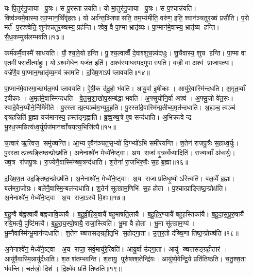 यः पि॒तुर॑नु॒जाया पु॒त्रः। स पु॒रस्तान्नयति। यो मा॒तुर॑नु॒जाया पु॒त्रः। स प॒श्चान्न॑यति। विष्व॑ञ्चमे॒वास्मात्पा॒प्मान॒व्विँवृ॑हतः। यो अर्व॑न्त॒ञ्जिघासति॒ तम॒भ्य॑मीति॒ वरु॑ण॒ इति॒ श्वान॑ञ्चतुर॒ख्षं प्रसौ॑ति। प॒रो मर्त॑ प॒रश्श्वेति॒ शुन॑श्चतुर॒ख्षस्य॒ प्रह॑न्ति। श्वेव॒ वै पा॒प्मा भ्रातृ॑व्यः। पा॒प्मान॑मे॒वास्य॒ भ्रातृ॑व्य हन्ति। सै॒ध्र॒कम्मुस॑लम्भवति॥१३॥

कर्म॑कर्मै॒वास्मै॑ साधयति। पौ॒श्च॒ले॒यो ह॑न्ति। पु॒श्च॒ल्वाव्वैँ दे॒वाश्शुच॒न्न्य॑दधुः। शु॒चैवास्य॒ शुच हन्ति। पा॒प्मा वा ए॒तमीफ्स॒तीत्या॑हुः। योऽश्वमे॒धेन॒ यज॑त॒ इति॑। अश्व॑स्याधस्प॒दमुपास्यति। व॒ज्री वा अश्व॑ प्राजाप॒त्यः। वज्रे॑णै॒व पा॒प्मान॒म्भ्रातृ॑व्य॒मव॑ क्रामति। द॒ख्षि॒णाऽप॑ प्लावयति॥१४॥

पा॒प्मान॑मे॒वास्मा॒च्छम॑ल॒मप॑ प्लावयति। ऐ॒षी॒क उ॑दू॒हो भ॑वति। आयु॒र्वा इ॒षीकाः। आयु॑रे॒वास्मि॑न्दधति। अ॒मृत॒व्वाँ इ॒षीकाः। अ॒मृत॑मे॒वास्मि॑न्दधति। वे॒त॒स॒शा॒खोप॒सम्ब॑द्धा भवति। अ॒फ्सुयो॑नि॒र्वा अश्व॑। अ॒फ्सु॒जो वे॑त॒सः। स्वादे॒वैन॒य्योँने॒र्निर्मि॑मीते। पु॒रस्तात्प्र॒त्यञ्च॑म॒भ्युदू॑हति। पु॒रस्ता॑दे॒वास्मि॑न्प्र॒तीच्य॒मृत॑न्दधाति। अ॒हञ्च॒ त्वञ्च॑ वृत्रह॒न्निति॑ ब्र॒ह्मा यज॑मानस्य॒ हस्त॑ङ्गृह्णाति। ब्र॒ह्म॒ख्ष॒त्रे ए॒व सन्द॑धाति। अ॒भिक्रत्वेन्द्र भू॒रध॒ज्मन्नित्य॑ध्व॒र्युर्यज॑मानव्वाँचयत्य॒भिजि॑त्यै॥१५॥\anuvakamend[भ॒व॒ति॒ प्ला॒व॒य॒ति॒ मि॒मी॒ते॒ पञ्च॑ च]

च॒त्वार॑ ऋ॒त्विज॒ समु॑ख्षन्ति। आ॒भ्य ए॒वैन॑ञ्चत॒सृभ्यो॑ दि॒ग्भ्यो॑ऽभि समी॑रयन्ति। श॒तेन॑ राजपु॒त्रैः स॒हाध्व॒र्युः। पु॒रस्तात्प्र॒त्यङ्तिष्ठ॒न्प्रोख्ष॑ति। अ॒नेनाश्वे॑न॒ मेध्ये॑ने॒ष्ट्वा। अ॒य राजा॑ वृ॒त्रव्वँ॑ध्या॒दिति॑। रा॒ज्यव्वाँ अ॑ध्व॒र्युः। ख्ष॒त्र रा॑जपु॒त्रः। रा॒ज्येनै॒वास्मि॑न्ख्ष॒त्रन्द॑धाति। श॒तेना॑ रा॒जभि॑रु॒ग्रैः स॒ह ब्र॒ह्मा॥१६॥

द॒ख्षि॒ण॒त उद॒ङ्तिष्ठ॒न्प्रोख्ष॑ति। अ॒नेनाश्वे॑न॒ मेध्ये॑ने॒ष्ट्वा। अ॒य राजाप्रतिधृ॒ष्योऽस्त्विति॑। बल॒व्वैँ ब्र॒ह्मा। बल॑मरा॒जोग्रः। बले॑नै॒वास्मि॒न्बल॑न्दधाति। श॒तेन॑ सूतग्राम॒णिभि॑ स॒ह होता। प॒श्चात्प्राङ्तिष्ठ॒न्प्रोक्ष॑ति। अ॒नेनाश्वे॑न॒ मेध्ये॑ने॒ष्ट्वा। अ॒य राजा॒ऽस्यै वि॒शः॥१७॥

ब॒हु॒ग्वै ब॑ह्व॒श्वायै॑ बह्वजावि॒कायै। ब॒हु॒व्री॒हि॒य॒वायै॑ बहुमाषति॒लायै। ब॒हु॒हि॒र॒ण्यायै॑ बहुह॒स्तिका॑यै। ब॒हु॒दा॒स॒पू॒रु॒षायै॑ रयि॒मत्यै॒ पुष्टि॑मत्यै। ब॒हु॒रा॒य॒स्पो॒षायै॒ राजा॒स्त्विति॑। भू॒मा वै होता। भू॒मा सू॑तग्राम॒ण्य॑। भू॒म्नैवास्मि॑न्भू॒मान॑न्दधाति। श॒तेन॑ ख्षत्तसङ्ग्रही॒तृभि॑ स॒होद्गा॒ता। उ॒त्त॒र॒तो द॑ख्षि॒णा तिष्ठ॒न्प्रोख्ष॑ति॥१८॥

अ॒नेनाश्वे॑न॒ मेध्ये॑ने॒ष्ट्वा। अ॒य राजा॒ सर्व॒मायु॑रे॒त्विति॑। आयु॒र्वा उ॑द्गा॒ता। आयु॑ ख्षत्तसङ्ग्रही॒तार॑। आयु॑षै॒वास्मि॒न्नायु॑र्दधाति। श॒तश॑तम्भवन्ति। श॒तायु॒ पुरु॑षश्श॒तेन्द्रि॑यः। आयु॑ष्ये॒वेन्द्रि॒ये प्रति॑तिष्ठति। च॒तु॒श्श॒ता भ॑वन्ति। चत॑स्रो॒ दिश॑। दि॒क्ष्वे॑व प्रति॑ तिष्ठति॥१९॥\anuvakamend[ब्र॒ह्मा वि॒श उ॑ख्षति॒ दिश॒ एक॑ञ्च]

